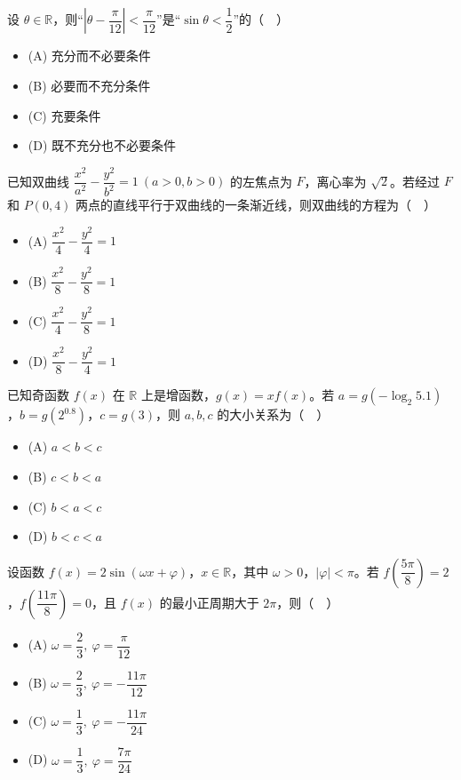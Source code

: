 \endgroup
\begin{question}
设 $\theta\in\mathbb R$，则“$\left|\theta-\dfrac\pi{12}\right|<\dfrac\pi{12}$”是“$\sin\theta<\dfrac12$”的（　）

\begin{itemize}
\item (A) 充分而不必要条件
\item (B) 必要而不充分条件
\item (C) 充要条件
\item (D) 既不充分也不必要条件
\end{itemize}

\end{question}
\begin{question}
已知双曲线 $\dfrac{x^2}{a^2}-\dfrac{y^2}{b^2}=1\ (a>0,b>0)$ 的左焦点为 $F$，离心率为 $\sqrt2$。若经过 $F$ 和 $P(0,4)$ 两点的直线平行于双曲线的一条渐近线，则双曲线的方程为（　）

\begin{itemize}
\item (A) $\dfrac{x^2}{4}-\dfrac{y^2}{4}=1$
\item (B) $\dfrac{x^2}{8}-\dfrac{y^2}{8}=1$
\item (C) $\dfrac{x^2}{4}-\dfrac{y^2}{8}=1$
\item (D) $\dfrac{x^2}{8}-\dfrac{y^2}{4}=1$
\end{itemize}

\end{question}
\begin{question}
已知奇函数 $f(x)$ 在 $\mathbb R$ 上是增函数，$g(x)=xf(x)$。若 $a=g(-\log_2 5.1)$，$b=g(2^{0.8})$，$c=g(3)$，则 $a,b,c$ 的大小关系为（　）

\begin{itemize}
\item (A) $a<b<c$
\item (B) $c<b<a$
\item (C) $b<a<c$
\item (D) $b<c<a$
\end{itemize}

\end{question}
\begin{question}
设函数 $f(x)=2\sin(\omega x+\varphi)$，$x\in\mathbb R$，其中 $\omega>0$，$|\varphi|<\pi$。若 $f\left(\dfrac{5\pi}{8}\right)=2$，$f\left(\dfrac{11\pi}{8}\right)=0$，且 $f(x)$ 的最小正周期大于 $2\pi$，则（　）

\begin{itemize}
\item (A) $\omega=\dfrac23,\ \varphi=\dfrac\pi{12}$
\item (B) $\omega=\dfrac23,\ \varphi=-\dfrac{11\pi}{12}$
\item (C) $\omega=\dfrac13,\ \varphi=-\dfrac{11\pi}{24}$
\item (D) $\omega=\dfrac13,\ \varphi=\dfrac{7\pi}{24}$
\end{itemize}

\end{question}
